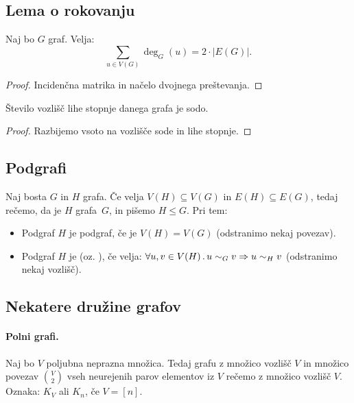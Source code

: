 \subsection{Lema o rokovanju}
\begin{lema}[o rokovanju]
    Naj bo $G$ graf. Velja: $$\sum_{u \in V(G)} \deg_G(u) = 2 \cdot |E(G)|.$$
\end{lema}

\begin{proof}
    Incidenčna matrika in načelo dvojnega preštevanja.
\end{proof}

\begin{posledica}
    Število vozlišč lihe stopnje danega grafa je sodo.
\end{posledica}

\begin{proof}
    Razbijemo vsoto na vozlišče sode in lihe stopnje.
\end{proof}

\subsection{Podgrafi}
\begin{definicija}
    Naj bosta $G$ in $H$ grafa. Če velja $V(H) \subseteq V(G)$ in $E(H) \subseteq E(G)$, tedaj rečemo, da je $H$  grafa~$G$, in pišemo $H \leq G$. Pri tem:
    \begin{itemize}
        \item Podgraf $H$ je  podgraf, če je $V(H) = V(G)$ (odstranimo nekaj povezav).
        \item Podgraf $H$ je  (oz. ), če velja:  $\forall u, v \in V(H) \,.\, u \sim_G v \Rightarrow u \sim_H v$ (odstranimo nekaj vozlišč).
    \end{itemize}
\end{definicija}

\newpage
\subsection{Nekatere družine grafov}
\paragraph{Polni grafi.} Naj bo $V$ poljubna neprazna množica. Tedaj grafu z množico vozlišč $V$ in množico povezav $\binom{V}{2}$ vseh neurejenih parov elementov iz $V$ rečemo  z množico vozlišč $V$. Oznaka: $K_V$ ali $K_n$, če $V = [n]$.

